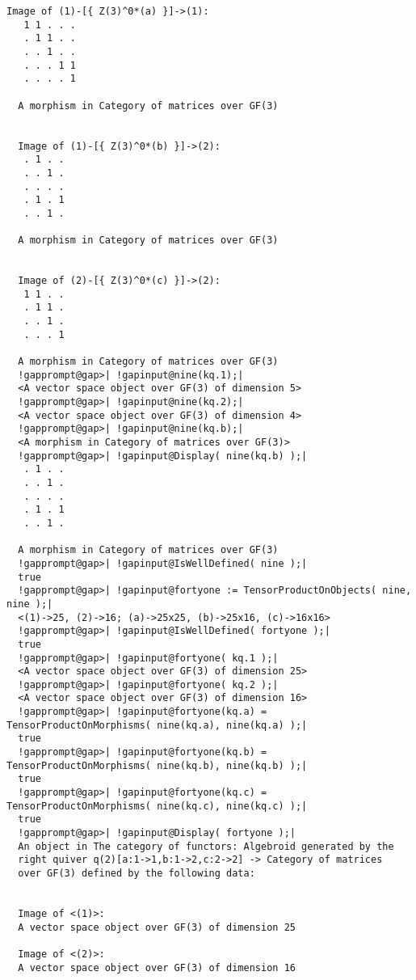 \documentclass[a4paper,11pt]{report}
\begin{document}
{{{\begin{Verbatim}[commandchars=!@|,fontsize=\small,frame=single,label=Example]
  Image of (1)-[{ Z(3)^0*(a) }]->(1):
   1 1 . . .
   . 1 1 . .
   . . 1 . .
   . . . 1 1
   . . . . 1
  
  A morphism in Category of matrices over GF(3)
  
  
  Image of (1)-[{ Z(3)^0*(b) }]->(2):
   . 1 . .
   . . 1 .
   . . . .
   . 1 . 1
   . . 1 .
  
  A morphism in Category of matrices over GF(3)
  
  
  Image of (2)-[{ Z(3)^0*(c) }]->(2):
   1 1 . .
   . 1 1 .
   . . 1 .
   . . . 1
  
  A morphism in Category of matrices over GF(3)
  !gapprompt@gap>| !gapinput@nine(kq.1);|
  <A vector space object over GF(3) of dimension 5>
  !gapprompt@gap>| !gapinput@nine(kq.2);|
  <A vector space object over GF(3) of dimension 4>
  !gapprompt@gap>| !gapinput@nine(kq.b);|
  <A morphism in Category of matrices over GF(3)>
  !gapprompt@gap>| !gapinput@Display( nine(kq.b) );|
   . 1 . .
   . . 1 .
   . . . .
   . 1 . 1
   . . 1 .
  
  A morphism in Category of matrices over GF(3)
  !gapprompt@gap>| !gapinput@IsWellDefined( nine );|
  true
  !gapprompt@gap>| !gapinput@fortyone := TensorProductOnObjects( nine, nine );|
  <(1)->25, (2)->16; (a)->25x25, (b)->25x16, (c)->16x16>
  !gapprompt@gap>| !gapinput@IsWellDefined( fortyone );|
  true
  !gapprompt@gap>| !gapinput@fortyone( kq.1 );|
  <A vector space object over GF(3) of dimension 25>
  !gapprompt@gap>| !gapinput@fortyone( kq.2 );|
  <A vector space object over GF(3) of dimension 16>
  !gapprompt@gap>| !gapinput@fortyone(kq.a) = TensorProductOnMorphisms( nine(kq.a), nine(kq.a) );|
  true
  !gapprompt@gap>| !gapinput@fortyone(kq.b) = TensorProductOnMorphisms( nine(kq.b), nine(kq.b) );|
  true
  !gapprompt@gap>| !gapinput@fortyone(kq.c) = TensorProductOnMorphisms( nine(kq.c), nine(kq.c) );|
  true
  !gapprompt@gap>| !gapinput@Display( fortyone );|
  An object in The category of functors: Algebroid generated by the
  right quiver q(2)[a:1->1,b:1->2,c:2->2] -> Category of matrices
  over GF(3) defined by the following data:
  
  
  Image of <(1)>:
  A vector space object over GF(3) of dimension 25
  
  Image of <(2)>:
  A vector space object over GF(3) of dimension 16
  

\end{Verbatim}}}}
\end{document}
